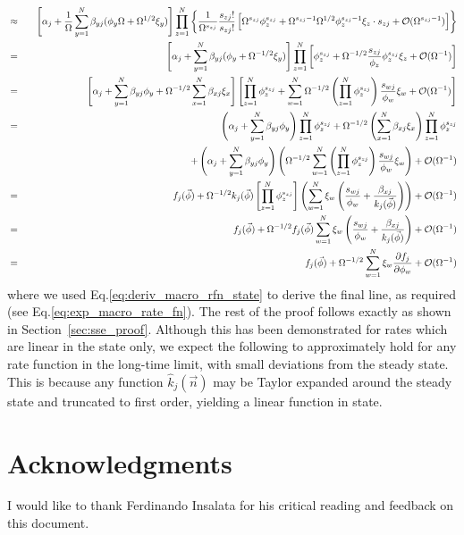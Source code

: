 \documentclass[10pt,letterpaper]{article}
\begin{document}
\begin{eqnarray}
&\approx& \left[ \alpha_j + \frac{1}{\Omega}\sum_{y=1}^N \beta_{yj} (\phi_y \Omega + \Omega^{1/2} \xi_y) \right] \prod_{z=1}^N \left\{ \frac{1}{\Omega^{s_{zj}}} \frac{s_{zj}!}{s_{zj}!}\left[ \Omega^{s_{zj}}\phi_z^{s_{zj}} + \Omega^{s_{zj}-1}\Omega^{1/2}\phi_z^{s_{zj}-1}\xi_z \cdot s_{zj} + \mathcal{O}(\Omega^{s_{zj}-1})\right] \right\} \nonumber \\
&=&  \left[ \alpha_j +\sum_{y=1}^N \beta_{yj} (\phi_y + \Omega^{-1/2} \xi_y) \right] \prod_{z=1}^N  \left[ \phi_z^{s_{zj}} + \Omega^{-1/2}\frac{s_{zj}}{\phi_z}\phi_z^{s_{zj}}\xi_z + \mathcal{O}(\Omega^{-1})\right] \nonumber \\
&=&  \left[ \alpha_j +\sum_{y=1}^N \beta_{yj} \phi_y + \Omega^{-1/2} \sum_{x=1}^N \beta_{xj} \xi_x \right]\left[ \prod_{z=1}^N \phi_z^{s_{zj}} + \sum_{w=1}^N \Omega^{-1/2}\left(\prod_{z=1}^N \phi_z^{s_{zj}}\right) \frac{s_{wj}}{\phi_w}\xi_w + \mathcal{O}(\Omega^{-1}) \right] \nonumber\\
&=& \left( \alpha_j +\sum_{y=1}^N \beta_{yj} \phi_y \right) \prod_{z=1}^N \phi_z^{s_{zj}} + \Omega^{-1/2} \left(\sum_{x=1}^N \beta_{xj} \xi_x \right) \prod_{z=1}^N \phi_z^{s_{zj}}\nonumber \\
&\qquad& + \left( \alpha_j +\sum_{y=1}^N \beta_{yj} \phi_y \right) \left(\Omega^{-1/2} \sum_{w=1}^N \left(\prod_{z=1}^N \phi_z^{s_{zj}}\right) \frac{s_{wj}}{\phi_w}\xi_w \right) + \mathcal{O}(\Omega^{-1}) \nonumber \\
&=& f_j(\vec{\phi}) + \Omega^{-1/2} k_j(\vec{\phi}) \left[\prod_{z=1}^N \phi_z^{s_{zj}} \right] \left(\sum_{w=1}^N \xi_w \left(\frac{s_{wj}}{\phi_w} + \frac{\beta_{xj}}{k_j(\vec{\phi})} \right) \right) + \mathcal{O}(\Omega^{-1})  \nonumber \\
&=& f_j(\vec{\phi}) + \Omega^{-1/2} f_j(\vec{\phi}) \sum_{w=1}^N \xi_w \left(\frac{s_{wj}}{\phi_w} + \frac{\beta_{xj}}{k_j(\vec{\phi})} \right) + \mathcal{O}(\Omega^{-1}) \nonumber \\
&=&  f_j(\vec{\phi}) + \Omega^{-1/2}\sum_{w=1}^N \xi_w \frac{\partial f_j}{\partial\phi_w} + \mathcal{O}(\Omega^{-1})
\end{eqnarray}
where we used Eq.\eqref{eq:deriv_macro_rfn_state} to derive the final line, as required (see Eq.\eqref{eq:exp_macro_rate_fn}). The rest of the proof follows exactly as shown in Section~\ref{sec:sse_proof}. Although this has been demonstrated for rates which are linear in the state only, we expect the following to approximately hold for any rate function in the long-time limit, with small deviations from the steady state. This is because any function $\hat{k}_j(\vec{n})$ may be Taylor expanded around the steady state and truncated to first order, yielding a linear function in state.

\section*{Acknowledgments}

I would like to thank Ferdinando Insalata for his critical reading and feedback on this document.



\end{document}
